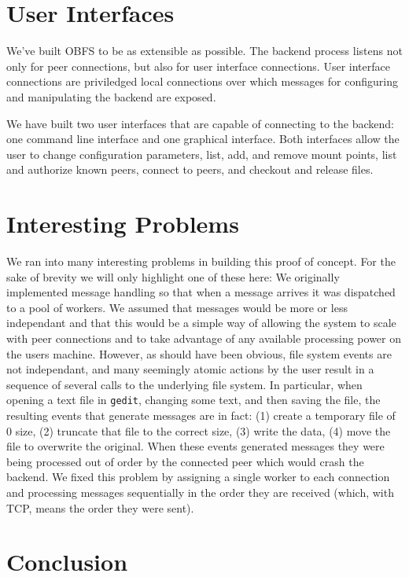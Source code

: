 \documentclass[10pt,twocolumn]{article}
\begin{document}
\section{User Interfaces}
We've built OBFS to be as extensible as possible. The backend process listens
not only for peer connections, but also for user interface connections. User
interface connections are priviledged local connections over which messages
for configuring and manipulating the backend are exposed. 

We have built two user interfaces that are capable of connecting to the 
backend: one command line interface and one graphical interface. Both 
interfaces allow the user to change configuration parameters, list, add, and
remove mount points, list and authorize known peers, connect to peers, 
and checkout and release files. 

\section{Interesting Problems}

We ran into many interesting problems in building this proof of concept. For the
sake of brevity we will only highlight one of these here: We originally 
implemented message handling so that when a message arrives it was dispatched
to a pool of workers. We assumed that messages would be more or less independant
and that this would be a simple way of allowing the system to scale with peer
connections and to take advantage of any available processing power on the 
users machine. However, as should have been obvious, file 
system events are not independant, and many seemingly atomic actions by the
user result in a sequence of several calls to the underlying file system. 
In particular, when opening a text file in \texttt{gedit}, changing some text, 
and then saving the file, the resulting events that generate messages are in 
fact:
(1) create a temporary file of 0 size, (2) truncate that file to the correct
size, (3) write the data, (4) move the file to overwrite the original. When 
these events generated messages they were being processed out of order by the
connected peer which would crash the backend. We fixed this problem by
assigning a single worker to each connection and processing messages 
sequentially in the order they are received (which, with TCP, means the order
they were sent).  



\section{Conclusion}
\end{document}
